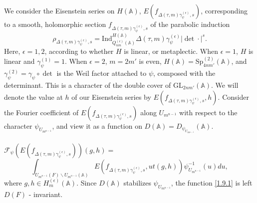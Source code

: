\documentclass[12pts]{amsart}
\newcommand{\BA}{{\mathbb {A}}}
\newcommand{\GL}{{\mathrm{GL}}}
\newcommand{\Ind}{{\mathrm{Ind}}}
\newcommand{\Sp}{{\mathrm{Sp}}}
\begin{document}
We consider the Eisenstein series on $H(\BA)$, $E(f_{\Delta(\tau,
	m)\gamma^{(\epsilon)}_\psi,s})$, corresponding to a smooth, holomorphic section
$f_{\Delta(\tau,m)\gamma^{(\epsilon)}_\psi,s}$ of the parabolic induction
$$
\rho_{\Delta(\tau,m)\gamma^{(\epsilon)}_\psi,s}=\Ind_{Q^{(\epsilon)}_{nm}(\BA)}^{H(\BA)}\Delta(\tau,
m)\gamma^{(\epsilon)}_\psi|\det\cdot|^s.
$$
Here, $\epsilon=1,2$, according to whether $H$ is linear, or metaplectic. When $\epsilon=1$, $H$ is linear and $\gamma^{(1)}_\psi=1$. When $\epsilon=2$, $m=2m'$ is even, $H(\BA)=\Sp^{(2)}_{4nm'}(\BA)$, and $\gamma^{(2)}_\psi=\gamma_\psi\circ \det$ is the Weil factor attached to $\psi$, composed with the determinant. This is a character of the double cover of $\GL_{2nm'}(\BA)$.
We will denote the value at $h$ of our Eisenstein series by $E(f_{\Delta(\tau, m)\gamma^{(\epsilon)}_\psi,s},h)$.
Consider the Fourier coefficient of $E(f_{\Delta(\tau, m)\gamma^{(\epsilon)}_\psi,s})$
along $U_{m^{n-1}}$ with respect to the character $\psi_{U_{m^{n-1}}}$, and
view it as a function on $D(\BA)=D_{\psi_{U_{m^{n-1}}}}(\BA)$.\\
\\
$\mathcal{F}_\psi(E(f_{\Delta(\tau, m)\gamma^{(\epsilon)}_\psi,s}))(g,h)=$
\begin{equation}\label{1.9.1}
\int_{U_{m^{n-1}}(F)\backslash
	U_{m^{n-1}}(\BA)}E(f_{\Delta(\tau,
	m)\gamma^{(\epsilon)}_\psi,s},ut(g,h))\psi^{-1}_{U_{m^{n-1}}}(u)du,
\end{equation}
where $g, h\in H^{(\epsilon)}_m(\BA)$. Since $D(\BA)$
stabilizes $\psi_{U_{m^{n-1}}}$, the function \eqref{1.9.1} is left
$D(F)$ - invariant.
\end{document}
